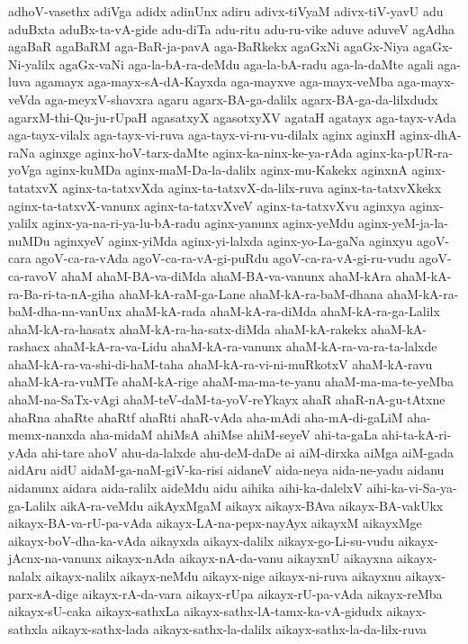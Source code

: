 {adhoV-vasethx
adiVga
adidx
adinUnx
adiru
adivx-tiVyaM
adivx-tiV-yavU
adu
aduBxta
aduBx-ta-vA-gide
adu-diTa
adu-ritu
adu-ru-vike
aduve
aduveV
agAdha
agaBaR
agaBaRM
aga-BaR-ja-pavA
aga-BaRkekx
agaGxNi
agaGx-Niya
agaGx-Ni-yalilx
agaGx-vaNi
aga-la-bA-ra-deMdu
aga-la-bA-radu
aga-la-daMte
agali
aga-luva
agamayx
aga-mayx-sA-dA-Kayxda
aga-mayxve
aga-mayx-veMba
aga-mayx-veVda
aga-meyxV-shavxra
agaru
agarx-BA-ga-dalilx
agarx-BA-ga-da-lilxdudx
agarxM-thi-Qu-ju-rUpaH
agasatxyX
agasotxyXV
agataH
agatayx
aga-tayx-vAda
aga-tayx-vilalx
aga-tayx-vi-ruva
aga-tayx-vi-ru-vu-dilalx
aginx
aginxH
aginx-dhA-raNa
aginxge
aginx-hoV-tarx-daMte
aginx-ka-ninx-ke-ya-rAda
aginx-ka-pUR-ra-yoVga
aginx-kuMDa
aginx-maM-Da-la-dalilx
aginx-mu-Kakekx
aginxnA
aginx-tatatxvX
aginx-ta-tatxvXda
aginx-ta-tatxvX-da-lilx-ruva
aginx-ta-tatxvXkekx
aginx-ta-tatxvX-vanunx
aginx-ta-tatxvXveV
aginx-ta-tatxvXvu
aginxya
aginx-yalilx
aginx-ya-na-ri-ya-lu-bA-radu
aginx-yanunx
aginx-yeMdu
aginx-yeM-ja-la-nuMDu
aginxyeV
aginx-yiMda
aginx-yi-lalxda
aginx-yo-La-gaNa
aginxyu
agoV-cara
agoV-ca-ra-vAda
agoV-ca-ra-vA-gi-puRdu
agoV-ca-ra-vA-gi-ru-vudu
agoV-ca-ravoV
ahaM
ahaM-BA-va-diMda
ahaM-BA-va-vanunx
ahaM-kAra
ahaM-kA-ra-Ba-ri-ta-nA-giha
ahaM-kA-raM-ga-Lane
ahaM-kA-ra-baM-dhana
ahaM-kA-ra-baM-dha-na-vanUnx
ahaM-kA-rada
ahaM-kA-ra-diMda
ahaM-kA-ra-ga-Lalilx
ahaM-kA-ra-hasatx
ahaM-kA-ra-ha-satx-diMda
ahaM-kA-rakekx
ahaM-kA-rashacx
ahaM-kA-ra-va-Lidu
ahaM-kA-ra-vanunx
ahaM-kA-ra-va-ra-ta-lalxde
ahaM-kA-ra-va-shi-di-haM-taha
ahaM-kA-ra-vi-ni-muRkotxV
ahaM-kA-ravu
ahaM-kA-ra-vuMTe
ahaM-kA-rige
ahaM-ma-ma-te-yanu
ahaM-ma-ma-te-yeMba
ahaM-na-SaTx-vAgi
ahaM-teV-daM-ta-yoV-reYkayx
ahaR
ahaR-nA-gu-tAtxne
ahaRna
ahaRte
ahaRtf
ahaRti
ahaR-vAda
aha-mAdi
aha-mA-di-gaLiM
aha-memx-nanxda
aha-midaM
ahiMsA
ahiMse
ahiM-seyeV
ahi-ta-gaLa
ahi-ta-kA-ri-yAda
ahi-tare
ahoV
ahu-da-lalxde
ahu-deM-daDe
ai
aiM-dirxka
aiMga
aiM-gada
aidAru
aidU
aidaM-ga-naM-giV-ka-risi
aidaneV
aida-neya
aida-ne-yadu
aidanu
aidanunx
aidara
aida-ralilx
aideMdu
aidu
aihika
aihi-ka-dalelxV
aihi-ka-vi-Sa-ya-ga-Lalilx
aikA-ra-veMdu
aikAyxMgaM
aikayx
aikayx-BAva
aikayx-BA-vakUkx
aikayx-BA-va-rU-pa-vAda
aikayx-LA-na-pepx-nayAyx
aikayxM
aikayxMge
aikayx-boV-dha-ka-vAda
aikayxda
aikayx-dalilx
aikayx-go-Li-su-vudu
aikayx-jAcnx-na-vanunx
aikayx-nAda
aikayx-nA-da-vanu
aikayxnU
aikayxna
aikayx-nalalx
aikayx-nalilx
aikayx-neMdu
aikayx-nige
aikayx-ni-ruva
aikayxnu
aikayx-parx-sA-dige
aikayx-rA-da-vara
aikayx-rUpa
aikayx-rU-pa-vAda
aikayx-reMba
aikayx-sU-caka
aikayx-sathxLa
aikayx-sathx-lA-tamx-ka-vA-gidudx
aikayx-sathxla
aikayx-sathx-lada
aikayx-sathx-la-dalilx
aikayx-sathx-la-da-lilx-ruva
}
